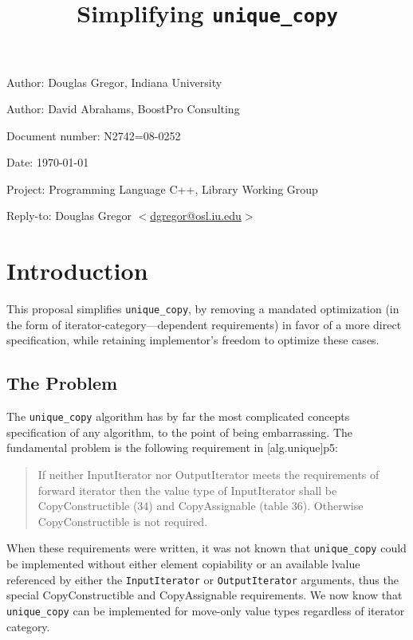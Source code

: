 \documentclass[american]{article}
\newcommand{\code}[1]{\lstinline[basicstyle=\sffamily,keywords={}]{#1}}
\newcommand{\tcode}[1]{\code{#1}}
\begin{document}
\pagestyle{myheadings}

\title{Simplifying \tcode{unique_copy}}
\author{}

\date{}
\maketitle
\vspace{-0.5in}
\par\noindent Author: Douglas Gregor, Indiana University
\par\noindent Author: David Abrahams, BoostPro Consulting
\par\noindent Document number: N2742=08-0252
\par\noindent Date: \today
\par\noindent Project: Programming Language C++, Library Working Group
\par\noindent Reply-to: Douglas Gregor $<$\href{mailto:dgregor@osl.iu.edu}{dgregor@osl.iu.edu}$>$

\section{Introduction}
This proposal simplifies \tcode{unique_copy}, by removing a mandated
optimization (in the form of iterator-category---dependent requirements)
in favor of a more direct specification, while retaining implementor's
freedom to optimize these cases.

\subsection{The Problem}
The \tcode{unique_copy} algorithm has by far the most complicated
concepts specification of any algorithm, to the point of being
embarrassing. The fundamental problem is
the following requirement in [alg.unique]p5:

\begin{quote}
  If neither InputIterator nor OutputIterator meets the requirements
  of forward iterator then the value type of InputIterator shall be
  CopyConstructible (34) and CopyAssignable (table 36). Otherwise
  CopyConstructible is not required.
\end{quote}

When these requirements were written, it was not known that \tcode{unique_copy}
could be implemented without either element copiability or an available lvalue
referenced by either the \tcode{InputIterator} or \tcode{OutputIterator}
arguments, thus the special CopyConstructible and CopyAssignable requirements.
We now know that \tcode{unique_copy} can be implemented for move-only value
types regardless of iterator category.
\end{document}

